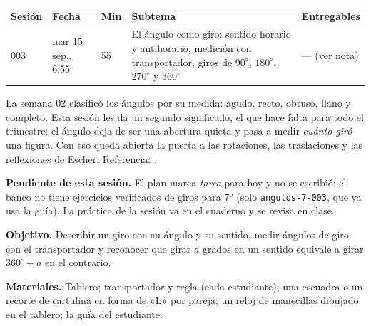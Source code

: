 \documentclass[11pt]{article}
\begin{document}
\encabezado*

\begin{center}
{\renewcommand{\arraystretch}{1.3}
\begin{tabularx}{\linewidth}{@{}l l l X l@{}}
  \toprule
  \textbf{Sesión} & \textbf{Fecha} & \textbf{Min} & \textbf{Subtema} & \textbf{Entregables}\\
  \midrule
  003 & mar 15 sep., 6:55 & 55 & El ángulo como giro: sentido horario y antihorario,
      medición con transportador, giros de $90^\circ$, $180^\circ$, $270^\circ$ y
      $360^\circ$ & --- (ver nota)\\
  \bottomrule
\end{tabularx}}
\end{center}

La semana 02 clasificó los ángulos por su medida: agudo, recto, obtuso, llano y completo.
Esta sesión les da un segundo significado, el que hace falta para todo el trimestre: el
ángulo deja de ser una abertura quieta y pasa a medir \emph{cuánto giró} una figura. Con
eso queda abierta la puerta a las rotaciones, las traslaciones y las reflexiones de
Escher. Referencia: .

\begin{nota}
\textbf{Pendiente de esta sesión.} El plan marca \emph{tarea} para hoy y no se escribió:
el banco no tiene ejercicios verificados de giros para 7° (solo \texttt{angulos-7-003}, que
ya usa la guía). La práctica de la sesión va en el cuaderno y se revisa en clase.
\end{nota}


\textbf{Objetivo.} Describir un giro con su ángulo y su sentido, medir ángulos de giro con
el transportador y reconocer que girar $a$ grados en un sentido equivale a girar
$360^\circ - a$ en el contrario.

\textbf{Materiales.} Tablero; transportador y regla (cada estudiante); una escuadra o un
recorte de cartulina en forma de «L» por pareja; un reloj de manecillas dibujado en el
tablero; la guía del estudiante.
\end{document}
